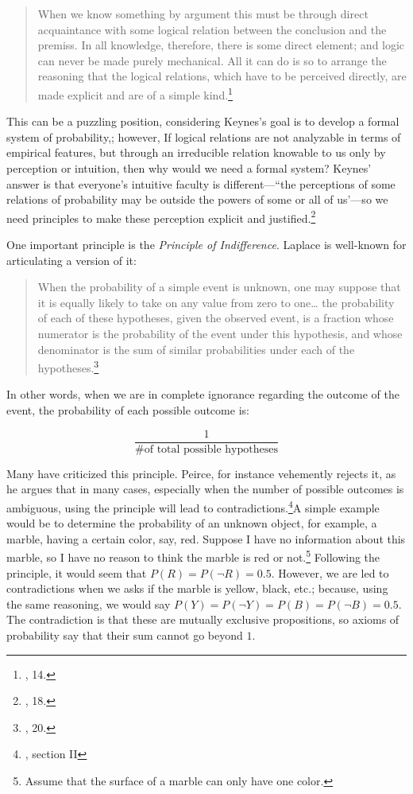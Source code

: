 \begin{quote}
When we know something by argument this must be through direct
acquaintance with some logical relation between the conclusion and the
premiss. In all knowledge, therefore, there is some direct element; and
logic can never be made purely mechanical. All it can do is so to
arrange the reasoning that the logical relations, which have to be
perceived directly, are made explicit and are of a simple
kind.\footnote{\cite{keynes}, 14.}
\end{quote}

This can be a puzzling position, considering Keynes's goal is to develop a
formal system of probability,; however, If logical relations are not
analyzable in terms of empirical features, but through an irreducible relation
knowable to us only by perception or intuition, then why would we need a
formal system? Keynes' answer is that everyone's intuitive faculty is
different---``the perceptions of some relations of probability may be
outside the powers of some or all of us'---so we need principles to make
these perception explicit and justified.\footnote{\cite{keynes}, 18.}

One important principle is the \emph{Principle of Indifference}. Laplace
is well-known for articulating a version of it:

\begin{quote}
When the probability of a simple event is unknown, one may suppose that
it is equally likely to take on any value from zero to one\ldots{} the
probability of each of these hypotheses, given the observed event, is a
fraction whose numerator is the probability of the event under this hypothesis, and whose denominator is the sum of similar probabilities under each of the hypotheses.\footnote{\cite{laplace}, 20.}
\end{quote}

In other words, when we are in complete ignorance regarding the outcome
of the event, the probability of each possible outcome is:

$$\frac{1}{\text{\# of total possible hypotheses}}$$

Many have criticized this principle. Peirce, for instance vehemently
rejects it, as he argues that in many cases, especially when the number
of possible outcomes is ambiguous, using the principle will lead to
contradictions.\footnote{\cite{probabilityofinduction}, section II}A simple example would be to determine the probability of an unknown object, for example, a marble, having a certain color, say, red. Suppose I have no information about this marble, so I have no
reason to think the marble is red or not.\footnote{Assume that the surface
  of a marble can only have one color.} Following the principle, it would
seem that \(P(R) = P(\neg R) = 0.5\). However, we are led to
contradictions when we asks if the marble is yellow, black, etc.; because,
using the same reasoning, we would say
\(P(Y) = P(\neg Y) = P(B) = P(\neg B) = 0.5\). The contradiction is that
these are mutually exclusive propositions, so axioms of probability say
that their sum cannot go beyond \(1\).


